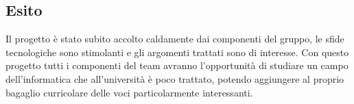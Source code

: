 \subsection{Esito}
  Il progetto è stato subito accolto caldamente dai componenti del gruppo, le sfide tecnologiche sono stimolanti e gli argomenti trattati sono di interesse. Con questo progetto tutti i componenti del team avranno l’opportunità di studiare un campo dell’informatica che all’università è poco trattato, potendo aggiungere al proprio bagaglio curricolare delle voci particolarmente interessanti.